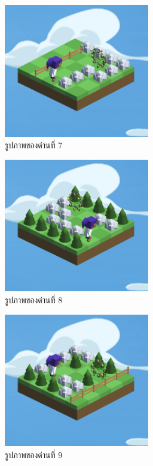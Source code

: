\begin{figure}[H]
    \begin{center}
    \includegraphics[width=2.5in]{pic-toro/stage/s7.png}
    \end{center}
    \caption[รูปภาพของด่านที่ 7]{รูปภาพของด่านที่ 7}
    \label{s7}
\end{figure}
\begin{figure}[H]
    \begin{center}
    \includegraphics[width=2.5in]{pic-toro/stage/s8.png}
    \end{center}
    \caption[รูปภาพของด่านที่ 8]{รูปภาพของด่านที่ 8}
    \label{s8}
\end{figure}
\begin{figure}[H]
    \begin{center}
    \includegraphics[width=2.5in]{pic-toro/stage/s9.png}
    \end{center}
    \caption[รูปภาพของด่านที่ 9]{รูปภาพของด่านที่ 9}
    \label{s9}
\end{figure}

